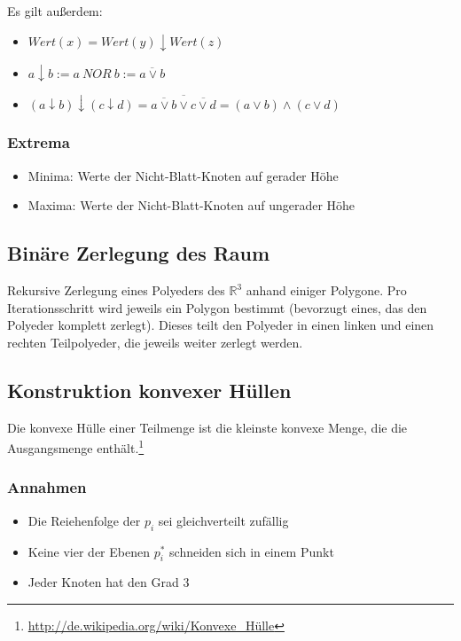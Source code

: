 Es gilt außerdem:
\begin{itemize}
	\item \(Wert(x) = Wert(y) \downarrow Wert(z)\)
	\item \(a \downarrow b := a~NOR~b := \overline{a \vee b}\)
	\item \((a \downarrow b) \downarrow (c \downarrow d) = \overline{\overline{a \vee b} \vee \overline{c \vee d}} = (a \vee b) \wedge (c \vee d)\)
\end{itemize}

\subsubsection{Extrema}
\begin{itemize}
	\item Minima: Werte der Nicht-Blatt-Knoten auf gerader Höhe
	\item Maxima: Werte der Nicht-Blatt-Knoten auf ungerader Höhe
\end{itemize}




\subsection{Binäre Zerlegung des Raum}
Rekursive Zerlegung eines Polyeders des \(\mathbb{R}^3\) anhand einiger Polygone. Pro Iterationsschritt wird jeweils ein Polygon bestimmt (bevorzugt eines, das den Polyeder komplett zerlegt). Dieses teilt den Polyeder in einen linken und einen rechten Teilpolyeder, die jeweils weiter zerlegt werden.
\text{}\\



\subsection{Konstruktion konvexer Hüllen}
Die konvexe Hülle einer Teilmenge ist die kleinste konvexe Menge, die die Ausgangsmenge enthält.\footnote{\url{http://de.wikipedia.org/wiki/Konvexe_Hülle}}

\subsubsection{Annahmen}
\begin{itemize}
	\item Die Reiehenfolge der \(p_i\) sei gleichverteilt zufällig
	\item Keine vier der Ebenen \(p_i^{*}\) schneiden sich in einem Punkt
	\item Jeder Knoten hat den Grad \(3\)
\end{itemize}



